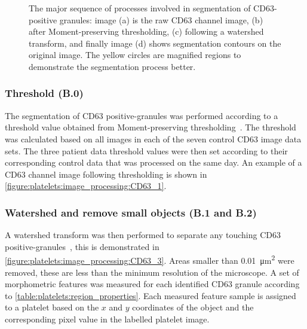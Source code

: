 \begin{figure}[htbp]
\begin{subfigure}[b]{0.45\linewidth}
		\caption{}
		\label{figure:platelets:image_processing:CD63_4}
		\vspace{1ex}
	\end{subfigure}
	\caption[CD63 positive-granule segmentation]{The major sequence of processes involved in segmentation of CD63-positive granules: image (a) is the raw CD63 channel image, (b) after Moment-preserving thresholding, (c) following a watershed transform, and finally image (d) shows segmentation contours on the original image. The yellow circles are magnified regions to demonstrate the segmentation process better.}
	\label{figure:image_processing:granules}
\end{figure}

\subsubsection{Threshold (B.0)}
The segmentation of CD63 positive-granules was performed according to a threshold value obtained from Moment-preserving thresholding~\cite{Tsai1985}. The threshold was calculated based on all images in each of the seven control CD63 image data sets. The three patient data threshold values were then set according to their corresponding control data that was processed on the same day. An example of a CD63 channel image following thresholding is shown in \autoref{figure:platelets:image_processing:CD63_1}.

\subsubsection{Watershed and remove small objects (B.1 and B.2)}
A watershed transform was then performed to separate any touching CD63 positive-granules~\cite{Vincent1991}, this is demonstrated in \autoref{figure:platelets:image_processing:CD63_3}. Areas smaller than \SI{0.01}{\micro\meter\squared} were removed, these are less than the minimum resolution of the microscope. A set of morphometric features was measured for each identified CD63 granule according to \autoref{table:platelets:region_properties}. Each measured feature sample is assigned to a platelet based on the $x$ and $y$ coordinates of the object and the corresponding pixel value in the labelled platelet image.

